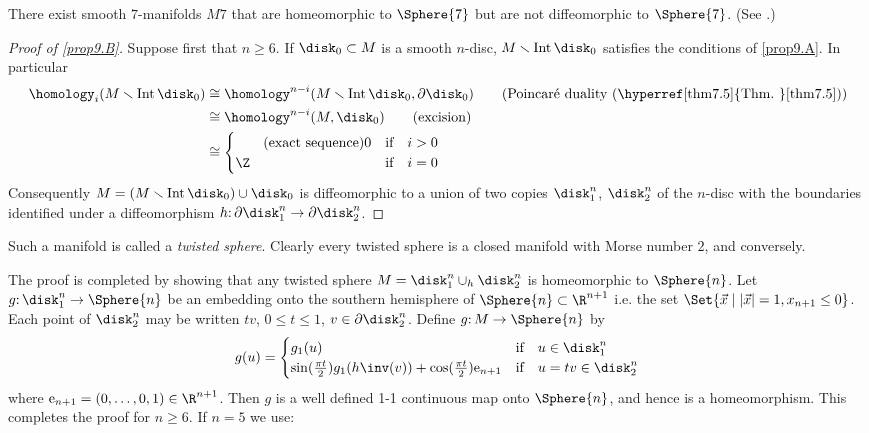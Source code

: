 \begin{remark*}
	There exist smooth $7$-manifolds $M7$ that are 
	homeomorphic to  $\Sphere{7}$ but are not diffeomorphic to  $\Sphere{7}$. (See \cite{24}.)
\end{remark*}

\begin{proof}[Proof of \cref{prop9.B}]
	Suppose first that $n \geq 6$. If $\disk_0\subset M$ is a smooth
	$n$-disc, $M\smallsetminus
	\mathrm{Int\,}\disk_0$ satisfies the conditions of \cref{prop9.A}. In particular
	\begin{align*}
	\homology_i(M\smallsetminus
	\mathrm{Int\,}\disk_0) &\cong \homology^{n-i}(M\smallsetminus
	\mathrm{Int\,}\disk_0, \partial \disk_0)\tag{\text{Poincar\'{e} duality (\hyperref[thm7.5]{Thm.~}\ref{thm7.5})}}\\
	&\cong \homology^{n-i}(M,\disk_0) \tag{\text{excision}}\\
	&\cong\begin{cases}\tag{\text{exact sequence}}
	0&\text{if}\quad i>0\\
	\Z&\text{if}\quad i=0
	\end{cases}
	\end{align*}
	Consequently $M = (M\smallsetminus
	\mathrm{Int\,}\disk_0)\cup \disk_0$ is diffeomorphic to a union
	of two copies $\disk_1^n$, $\disk_2^n$ of the $n$-disc with the boundaries 
	identified under a diffeomorphism $h\mathpunct{ :}\partial \disk_1^n \to \partial \disk_2^n$.
\end{proof}

\begin{remark*}
	Such a manifold is called a \emph{twisted sphere}. Clearly every
	twisted sphere is a closed manifold with Morse number $2$, and conversely.
\end{remark*}
\label{p110}
The proof is completed by showing that any twisted sphere
$M =\disk_1^n \cup_h \disk_2^n$ is homeomorphic to $\Sphere{n}$. Let $g\mathpunct{ :} \disk_1^n\to \Sphere{n}$ be
an embedding onto the southern hemisphere of $ \Sphere{n}\subset\R^{n+1}$ i.e.
the set $\Set{\vec{x} \mid \lvert\vec{x}\rvert =1, x_{n+1}\leq 0}$. Each point of $\disk_2^n$ may be written $tv$, $0 \leq t \leq 1$, $v\in\partial \disk_2^n$. Define $g\mathpunct{ :} M\to \Sphere{n}$ by
\[g(u)=\begin{cases}
g_1(u)&\text{if}\quad u\in\disk_1^n\\
\sin(\frac{\pi t}{2})g_1(h\inv(v))+\cos(\frac{\pi t}{2}) \mathrm{e}_{n+1} &\text{if}\quad u=tv\in\disk_2^n
\end{cases}\]
where $\mathrm{e}_{n+1}=(0,\dots, 0,1)\in \R^{n+1}$. Then $g$ is a well defined 1-1 continuous map onto $\Sphere{n}$, and
hence is a homeomorphism. This completes the proof for $n \geq 6$. If $n =5$ we use:


